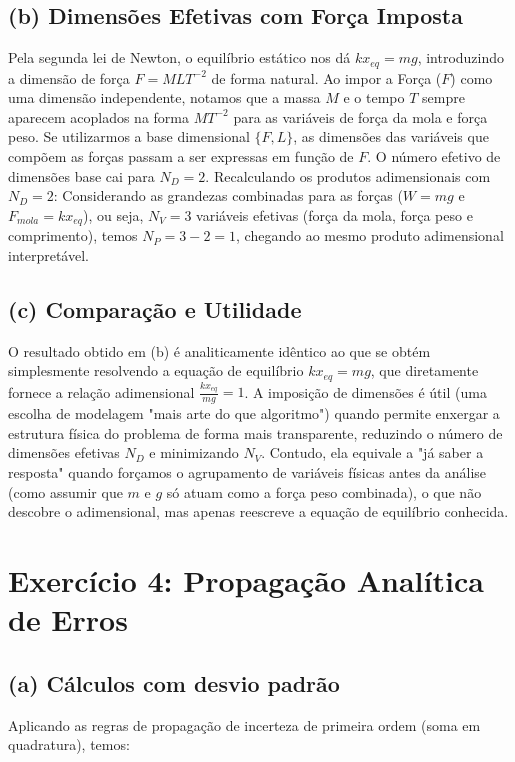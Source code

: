 \documentclass{article}
\begin{document}
\subsection*{(b) Dimensões Efetivas com Força Imposta}
Pela segunda lei de Newton, o equilíbrio estático nos dá $k x_{eq} = mg$, introduzindo a dimensão de força $F = MLT^{-2}$ de forma natural. Ao impor a Força ($F$) como uma dimensão independente, notamos que a massa $M$ e o tempo $T$ sempre aparecem acoplados na forma $MT^{-2}$ para as variáveis de força da mola e força peso.
Se utilizarmos a base dimensional $\{F, L\}$, as dimensões das variáveis que compõem as forças passam a ser expressas em função de $F$. O número efetivo de dimensões base cai para $N_D = 2$. 
Recalculando os produtos adimensionais com $N_D = 2$:
Considerando as grandezas combinadas para as forças ($W = mg$ e $F_{mola} = kx_{eq}$), ou seja, $N_V = 3$ variáveis efetivas (força da mola, força peso e comprimento), temos $N_P = 3 - 2 = 1$, chegando ao mesmo produto adimensional interpretável.

\subsection*{(c) Comparação e Utilidade}
O resultado obtido em (b) é analiticamente idêntico ao que se obtém simplesmente resolvendo a equação de equilíbrio $k x_{eq} = mg$, que diretamente fornece a relação adimensional $\frac{k x_{eq}}{mg} = 1$. 
A imposição de dimensões é útil (uma escolha de modelagem "mais arte do que algoritmo") quando permite enxergar a estrutura física do problema de forma mais transparente, reduzindo o número de dimensões efetivas $N_D$ e minimizando $N_V$. Contudo, ela equivale a "já saber a resposta" quando forçamos o agrupamento de variáveis físicas antes da análise (como assumir que $m$ e $g$ só atuam como a força peso combinada), o que não descobre o adimensional, mas apenas reescreve a equação de equilíbrio conhecida.

\section*{Exercício 4: Propagação Analítica de Erros}

\subsection*{(a) Cálculos com desvio padrão}
Aplicando as regras de propagação de incerteza de primeira ordem (soma em quadratura), temos:
\end{document}
